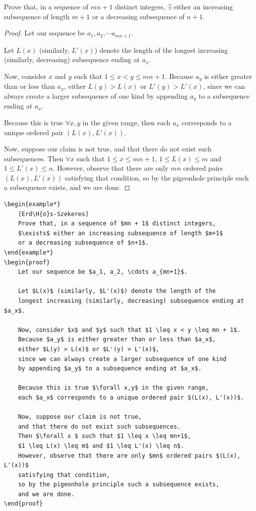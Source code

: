 \documentclass[a4paper]{scrartcl}
\begin{document}
\begin{example*}
	Prove that, in a sequence of $mn + 1$ distinct integers, $\exists$ either an increasing subsequence of length $m+1$ or a decreasing subsequence of $n+1$.
\end{example*}
\begin{proof}
	Let our sequence be $a_1, a_2, \cdots a_{mn+1}$.

	Let $L(x)$ (similarly, $L'(x)$) denote the length of the longest increasing (similarly, decreasing) subsequence ending at $a_x$.

	Now, consider $x$ and $y$ such that $1 \leq x < y \leq mn + 1$. Because $a_y$ is either greater than or less than $a_x$, either $L(y) > L(x)$ or $L'(y) > L'(x)$, since we can always create a larger subsequence of one kind by appending $a_y$ to a subsequence ending at $a_x$.

	Because this is true $\forall x,y$ in the given range, then each $a_x$ corresponds to a unique ordered pair $(L(x), L'(x))$.

	Now, suppose our claim is not true, and that there do not exist such subsequences. Then $\forall x $ such that $1 \leq x \leq mn+1$, $1 \leq L(x) \leq m$ and $1 \leq L'(x) \leq n$. However, observe that there are only $mn$ ordered pairs $(L(x), L'(x))$ satisfying that condition, so by the pigeonhole principle such a subsequence exists, and we are done.
\end{proof}

\begin{lstlisting}
\begin{example*}
	[Erd\H{o}s-Szekeres]
	Prove that, in a sequence of $mn + 1$ distinct integers, 
	$\exists$ either an increasing subsequence of length $m+1$ 
	or a decreasing subsequence of $n+1$.
\end{example*}
\begin{proof}
	Let our sequence be $a_1, a_2, \cdots a_{mn+1}$.

	Let $L(x)$ (similarly, $L'(x)$) denote the length of the 
	longest increasing (similarly, decreasing) subsequence ending at $a_x$.

	Now, consider $x$ and $y$ such that $1 \leq x < y \leq mn + 1$. 
	Because $a_y$ is either greater than or less than $a_x$, 
	either $L(y) > L(x)$ or $L'(y) > L'(x)$, 
	since we can always create a larger subsequence of one kind 
	by appending $a_y$ to a subsequence ending at $a_x$.

	Because this is true $\forall x,y$ in the given range, 
	each $a_x$ corresponds to a unique ordered pair $(L(x), L'(x))$.

	Now, suppose our claim is not true, 
	and that there do not exist such subsequences. 
	Then $\forall x $ such that $1 \leq x \leq mn+1$,
	$1 \leq L(x) \leq m$ and $1 \leq L'(x) \leq n$. 
	However, observe that there are only $mn$ ordered pairs $(L(x), L'(x))$ 
	satisfying that condition, 
	so by the pigeonhole principle such a subsequence exists, 
	and we are done.
\end{proof}
\end{lstlisting}
\end{document}
